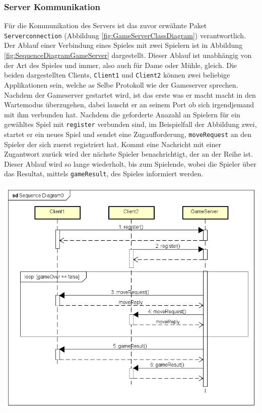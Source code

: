 \documentclass[12pt,a4paper,bibliography=totocnumbered,listof=totocnumbered]{article}
\begin{document}
\subsubsection{ Server Kommunikation }
Für die Kommunikation des Servers ist das zuvor erwähnte Paket \texttt{Serverconnection} (Abbildung \ref{fig:GameServerClassDiagram}) verantwortlich.
Der Ablauf einer Verbindung eines Spieles mit zwei Spielern ist in Abbildung \ref{fig:SequenceDiagramGameServer} dargestellt. 
Dieser Ablauf ist unabhängig von der Art des Spieles und immer, also auch für Dame oder Mühle, gleich.
Die beiden dargestellten Clients, \texttt{Client1} und \texttt{Client2} können zwei beliebige Applikationen sein, welche as Selbe Protokoll
wie der Gameserver sprechen.
\\
Nachdem der Gameserver gestartet wird, ist das erste was er macht macht in den Wartemodus überzugehen, dabei lauscht er an seinem Port ob sich irgendjemand
mit ihm verbunden hat. Nachdem die geforderte Anazahl an Spielern für ein gewähltes Spiel mit \texttt{register} verbunden sind, im Beispielfall der Abbildung zwei, 
startet er ein neues Spiel und sendet eine Zugaufforderung, \texttt{moveRequest} 
an den Spieler der sich zuerst registriert hat. Kommt eine Nachricht mit einer Zugantwort zurück
wird der nächste Spieler benachrichtigt, der an der Reihe ist. Dieser Ablauf wird so lange wiederholt, bis zum Spielende, wobei die Spieler 
über das Resultat, mittels \texttt{gameResult}, des Spieles informiert werden.
\\


\vspace{1em}
\begin{minipage}{\linewidth}
	\centering
	\includegraphics[width=0.7\linewidth]{pics/SequenceDiagramGameServer.png}
	\label{fig:SequenceDiagramGameServer}
\end{minipage}
\end{document}
